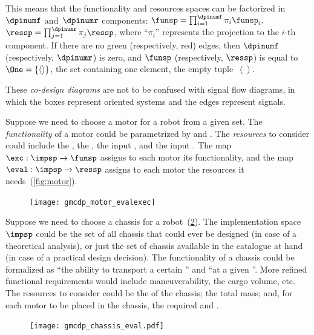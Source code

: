 \noindent This means that the functionality and resources spaces
can be factorized in~$\dpinumf$ and~$\dpinumr$ components: $\funsp=\prod_{i=1}^{\dpinumf}\pi_{i}\funsp_{i},$
$\ressp=\prod_{j=1}^{\dpinumr}\pi_{j}\ressp$, where ``$\pi_{i}$''
represents the projection to the $i$-th component. If there are no
green (respectively, red) edges, then $\dpinumf$ (respectively, $\dpinumr$)
is zero, and $\funsp$ (respectively, $\ressp$) is equal to~$\One=\{\left\langle \right\rangle \}$,
the set containing one element, the empty tuple~$\left\langle \right\rangle $.

These \emph{co-design diagrams} are not to be confused with signal
flow diagrams, in which the boxes represent oriented systems and the
edges represent signals.


\begin{example}
\label{exa:motor}Suppose we need to choose a motor for a robot from
a given set. The \emph{functionality} of a motor could be parametrized
by  and . The \emph{resources} to consider
could include the , the , the
input , and the input .
The map~$\exc:\impsp\rightarrow\funsp$ assigns to each motor its
functionality, and the map~$\eval:\impsp\rightarrow\ressp$ assigns
to each motor the resources it needs~(\cref{fig:motor}).
\end{example}

\begin{figure}[h]
    \centering
\texttt{[image: gmcdp\_motor\_evalexec]}
    \caption{\label{fig:motor_evalexec}}
\end{figure}


\begin{example}
\label{exa:chassis}Suppose we need to choose a chassis for a robot~(\cref{fig:gmcdp_chassis_eval}).
The implementation space~$\impsp$ could be the set of all chassis
that could ever be designed (in case of a theoretical analysis), or
just the set of chassis available in the catalogue at hand (in case
of a practical design decision). The functionality of a chassis could
be formalized as ``the ability to transport a certain '' and ``at a given ''. More refined
functional requirements would include maneuverability, the cargo volume,
etc. The resources to consider could be the  of
the chassis; the total mass; and, for each motor to be placed in the
chassis, the required  and .
\end{example}
\begin{figure}[h]
    \centering
    \texttt{[image: gmcdp\_chassis\_eval.pdf]}
    \caption{\label{fig:gmcdp_chassis_eval}}
\end{figure}
 


